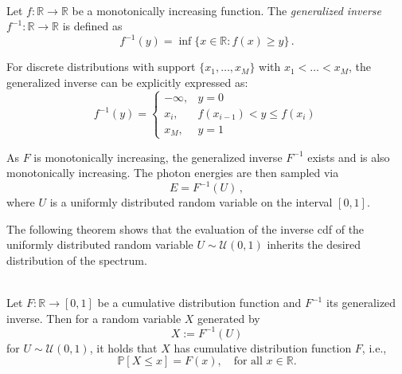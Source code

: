 \begin{definition} \ \\
    Let $f: \mathbb{R} \to \mathbb{R}$ be a monotonically increasing function. The \emph{generalized inverse} $f^{-1}: \mathbb{R} \to \mathbb{R}$ is defined as
    \begin{equation*}
        f^{-1}(y) = \inf\{x \in \mathbb{R} : f(x) \geq y\}\,.
    \end{equation*}
\end{definition}

\begin{remark}
    For discrete distributions with support $\{x_1, \ldots, x_M\}$ with $x_1<\ldots<x_M$, the generalized inverse can be explicitly expressed as:
    \begin{equation*}
        f^{-1}(y) = \begin{cases}
            -\infty, & y =0 \\
            x_i, & f(x_{i-1}) < y \leq f(x_i) \\
            x_M, & y=1
        \end{cases}
    \end{equation*}
\end{remark}

As $F$ is monotonically increasing, the generalized inverse $F^{-1}$ exists and
is also monotonically increasing. The photon energies are then sampled via
\begin{equation*}
    E = F^{-1}(U)\,,
\end{equation*}
where $U$ is a uniformly distributed random variable on the interval $[0,1]$.

The following theorem shows that the evaluation of the inverse \ac{cdf} of the
uniformly distributed random variable $U \sim \mathcal{U}(0,1)$ inherits the
desired distribution of the spectrum.

\begin{theorem} \ \\
Let $F:\mathbb{R}\to[0,1]$ be a cumulative distribution function and $F^{-1}$
its generalized inverse. Then for a random variable $X$ generated by
\begin{equation*}
    X := F^{-1}(U)
\end{equation*}
for $U \sim \mathcal{U}(0,1)$, it holds that $X$ has cumulative distribution function $F$, i.e.,
\begin{equation*}
    \mathbb{P}[X \leq x] = F(x), \quad \text{for all } x \in \mathbb{R}.
\end{equation*}
\end{theorem}

